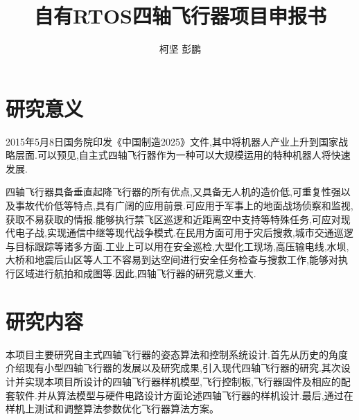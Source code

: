 \documentclass[10pt,a4paper]{article}
\title{自有RTOS四轴飞行器项目申报书}
\author{柯坚 彭鹏}
\begin{document}
\maketitle
\newpage
\tableofcontents
\newpage

\section{研究意义} 
2015年5月8日国务院印发《中国制造2025》文件,其中将机器人产业上升到国家战略层面.可以预见,自主式四轴飞行器作为一种可以大规模运用的特种机器人将快速发展.

四轴飞行器具备垂直起降飞行器的所有优点,又具备无人机的造价低,可重复性强以及事故代价低等特点,具有广阔的应用前景.可应用于军事上的地面战场侦察和监视,获取不易获取的情报.能够执行禁飞区巡逻和近距离空中支持等特殊任务,可应对现代电子战,实现通信中继等现代战争模式.在民用方面可用于灾后搜救,城市交通巡逻与目标跟踪等诸多方面.工业上可以用在安全巡检,大型化工现场,高压输电线,水坝,大桥和地震后山区等人工不容易到达空间进行安全任务检查与搜救工作,能够对执行区域进行航拍和成图等.因此,四轴飞行器的研究意义重大.

\section{研究内容} 
本项目主要研究自主式四轴飞行器的姿态算法和控制系统设计.首先从历史的角度介绍现有小型四轴飞行器的发展以及研究成果,引入现代四轴飞行器的研究.其次设计并实现本项目所设计的四轴飞行器样机模型,飞行控制板,飞行器固件及相应的配套软件.并从算法模型与硬件电路设计方面论述四轴飞行器的样机设计.最后,通过在样机上测试和调整算法参数优化飞行器算法方案。
\end{document}
